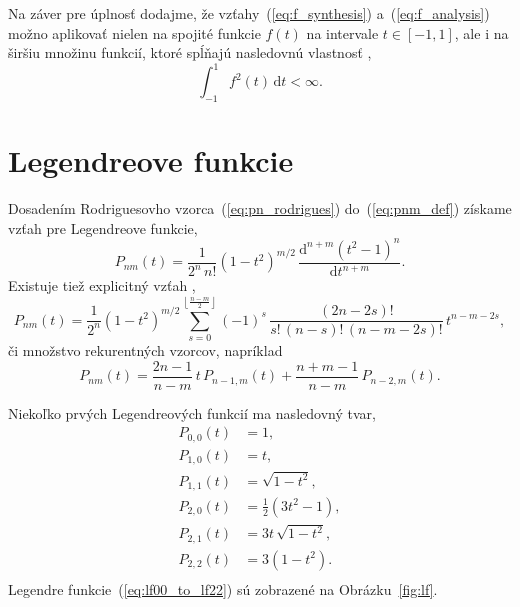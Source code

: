 \documentclass[a4paper, 12pt]{book}
\newcommand{\diff}{\mathrm d}
\begin{document}
Na záver pre úplnosť dodajme, že vzťahy~(\ref{eq:f_synthesis}) 
a~(\ref{eq:f_analysis}) možno aplikovať nielen na spojité funkcie $f(t)$ na 
intervale $t \in [-1, 1]$, ale i na širšiu množinu funkcií, ktoré spĺňajú 
nasledovnú vlastnosť \citep{Freeden2009},
%
\begin{equation}
\int_{-1}^{1} f^2(t) \, \diff t < \infty{.}
\end{equation}






\section{Legendreove funkcie}
\label{sec:legendre_functions}

Dosadením Rodriguesovho vzorca~(\ref{eq:pn_rodrigues}) do~(\ref{eq:pnm_def}) 
získame vzťah pre Legendreove funkcie,
%
\begin{equation}
P_{nm}(t) = \frac{1}{2^n \, n!} (1 - t^2)^{ m \slash 2} \, \frac{\diff^{n + m} 
(t^2 - 1)^n}{\diff t^{n + m}}{.}
\end{equation}
%
Existuje tiež explicitný vzťah \citep{Freeden2009},
%
\begin{equation}
P_{nm}(t) = \frac{1}{2^n}(1 - t^2)^{m \slash 2} \sum_{s = 0}^{\left\lfloor 
\frac{n - m}{2} \right\rfloor} (-1)^s \, \frac{(2n - 2s)!}{s! \, (n - s)! \, (n 
- m - 2s)!} \, t^{n - m - 2s}{,}
\end{equation}
%
či
%
množstvo rekurentných vzorcov, napríklad \citep{Freeden2009}
%
\begin{equation}
P_{nm}(t) = \frac{2n - 1}{n - m} \, t \, P_{n - 1, m}(t) + \frac{n + m - 1}{n 
- m} \, P_{n - 2, m}(t){.}
\end{equation}

Niekoľko prvých Legendreových funkcií ma nasledovný tvar,
%
\begin{equation}
\label{eq:lf00_to_lf22}
\begin{split}
P_{0,0}(t) & = 1{,}\\
P_{1,0}(t) & = t{,}\\
P_{1,1}(t) & = \sqrt{1 - t^2}{,}\\
P_{2,0}(t) & = \frac{1}{2}(3t^2 - 1){,}\\
P_{2,1}(t) & = 3t \, \sqrt{1 - t^2}{,}\\
P_{2,2}(t) & = 3(1 - t^2){.}\\
\end{split}
\end{equation}
%
Legendre funkcie~(\ref{eq:lf00_to_lf22}) sú zobrazené na Obrázku~\ref{fig:lf}.
\end{document}
